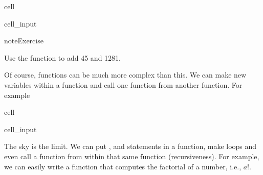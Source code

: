 \documentclass[letterpaper,10pt,english]{jupyterBook}
\begin{document}
\begin{sphinxuseclass}{cell}\begin{sphinxVerbatimInput}

\begin{sphinxuseclass}{cell_input}
\begin{sphinxVerbatim}[commandchars=\\\{\}]
  
       
\end{sphinxVerbatim}

\end{sphinxuseclass}\end{sphinxVerbatimInput}

\end{sphinxuseclass}
\begin{sphinxadmonition}{note}{Exercise}

\sphinxAtStartPar
Use the  function to add 45 and 1281.
\end{sphinxadmonition}

\sphinxAtStartPar
Of course, functions can be much more complex than this. We can make new variables within a function and call one function from another function. For example

\begin{sphinxuseclass}{cell}\begin{sphinxVerbatimInput}

\begin{sphinxuseclass}{cell_input}
\begin{sphinxVerbatim}[commandchars=\\\{\}]
  
       

   
       
      

  
\end{sphinxVerbatim}

\end{sphinxuseclass}\end{sphinxVerbatimInput}

\end{sphinxuseclass}
\sphinxAtStartPar
The sky is the limit. We can put ,  and  statements in a function, make  loops and even call a function from within that same function (recursiveness). For example, we can easily write a function that computes the factorial of a number, i.e., \(a!\).
\end{document}
